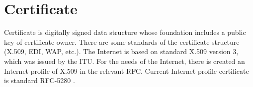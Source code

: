 \documentclass[
  digital, %
  notable,   %
  lof,     %
  lot,     %
]{fithesis3}
\begin{document}

\section{Certificate}
Certificate is digitally signed data structure whose foundation includes a public key of
certificate owner. There are some standards of the certificate structure (X.509, EDI, WAP, 
etc.). The Internet is based on standard X.509 version 3, which was issued by the ITU. For the 
needs of the Internet, there is created an Internet profile of X.509 in the relevant RFC. 
Current Internet profile certificate is standard RFC-5280 \cite{dostalek2016velky}.
\end{document}
